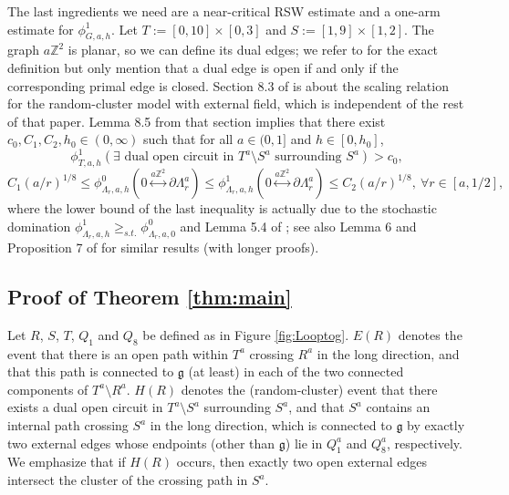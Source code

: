 \documentclass[article,12pt,reqno]{amsart}
\begin{document}
The last ingredients we need are a near-critical RSW estimate and a one-arm estimate for $\phi^1_{G,a,h}$. Let $T:=[0,10]\times [0,3]$ and $S:=[1,9]\times [1,2]$. The graph $a\mathbb{Z}^2$ is planar, so we can define its dual edges; we refer to \cite{Gri06} for the exact definition but only mention that a dual edge is open if and only if the corresponding primal edge is closed. Section 8.3 of \cite{DCM22} is about the scaling relation for the random-cluster model with external field, which is independent of the rest of that paper. Lemma 8.5 from that section implies that there exist $c_0,C_1,C_2,h_0\in(0,\infty)$ such that for all $a\in(0,1]$ and $h\in [0,h_0]$,
\begin{equation}\label{eq:nearcriticalRSW}
	\phi^1_{T,a,h}(\exists \text{ dual open circuit in }T^a\setminus S^a \text{ surrounding }S^a)>c_0,
\end{equation}
\begin{equation}\label{eq:onearm}
	C_1(a/r)^{1/8} \leq \phi^0_{\Lambda_{r},a,h}(0 \overset{a\mathbb{Z}^2}{\longleftrightarrow} \partial \Lambda^a_{r}) \leq \phi^1_{\Lambda_{r},a,h}(0 \overset{a\mathbb{Z}^2}{\longleftrightarrow} \partial \Lambda^a_{r}) \leq C_2 (a/r)^{1/8},~\forall r\in [a,1/2], \tag{1-arm}
\end{equation}
where the lower bound of the last inequality is actually due to the stochastic domination $\phi^1_{\Lambda_{r},a,h} \geq _{s.t.} \phi^0_{\Lambda_{r},a,0}$ and Lemma 5.4 of \cite{DCHN11}; see also Lemma 6 and Proposition 7 of \cite{CJN20b} for similar results (with longer proofs).


\subsection{Proof of Theorem \ref{thm:main}}
Let $R$, $S$, $T$, $Q_1$ and $Q_8$ be defined as in Figure \ref{fig:Looptog}. $E(R)$ denotes the event that there is an open path within $T^a$ crossing $R^a$ in the long direction, and that this path is connected to $\mathfrak{g}$ (at least) in each of the two connected components of $T^a\setminus R^a$. $H(R)$ denotes the (random-cluster) event that there exists a dual open circuit in $T^a\setminus S^a$ surrounding $S^a$, and that $S^a$ contains an internal path crossing $S^a$ in the long direction, which is connected to $\mathfrak{g}$ by exactly two external edges whose endpoints (other than $\mathfrak{g}$) lie in $Q^a_1$ and $Q^a_8$, respectively. We emphasize that if $H(R)$ occurs, then exactly two open external edges intersect the cluster of the crossing path in $S^a$.
\end{document}
